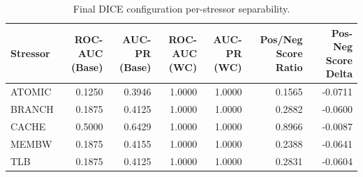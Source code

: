 \begin{table}[t]
\centering
\caption{Final DICE configuration per-stressor separability.}
\label{tab:dice_full_stressor}
\footnotesize
\begin{tabular}{lrrrrrr}
\toprule
Stressor & ROC-AUC (Base) & AUC-PR (Base) & ROC-AUC (WC) & AUC-PR (WC) & Pos/Neg Score Ratio & Pos-Neg Score Delta \\
\midrule
ATOMIC & 0.1250 & 0.3946 & 1.0000 & 1.0000 & 0.1565 & -0.0711 \\
BRANCH & 0.1875 & 0.4125 & 1.0000 & 1.0000 & 0.2882 & -0.0600 \\
CACHE & 0.5000 & 0.6429 & 1.0000 & 1.0000 & 0.8966 & -0.0087 \\
MEMBW & 0.1875 & 0.4155 & 1.0000 & 1.0000 & 0.2388 & -0.0641 \\
TLB & 0.1875 & 0.4125 & 1.0000 & 1.0000 & 0.2831 & -0.0604 \\
\bottomrule
\end{tabular}

\end{table}
